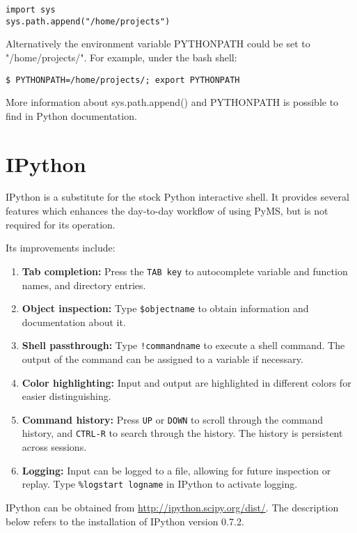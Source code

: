 \begin{verbatim}
import sys
sys.path.append("/home/projects")
\end{verbatim}

Alternatively the environment variable PYTHONPATH could be set
to "/home/projects/". For example, under the bash shell: 

\begin{verbatim}
$ PYTHONPATH=/home/projects/; export PYTHONPATH
\end{verbatim}

More information about sys.path.append() and PYTHONPATH is possible
to find in Python documentation.

\section{IPython}

IPython is a substitute for the stock Python interactive shell. It
provides several features which enhances the day-to-day workflow of
using PyMS, but is not required for its operation.

Its improvements include:
\begin{enumerate}
    \item {\bf Tab completion:} Press the {\tt TAB key} to autocomplete
          variable and function names, and directory entries.
    \item {\bf Object inspection:} Type {\tt \$objectname} to obtain
          information and documentation about it.
    \item {\bf Shell passthrough:} Type {\tt !commandname} to execute a
          shell command. The output of the command can be assigned to a
          variable if necessary.
    \item {\bf Color highlighting:} Input and output are highlighted in
          different colors for easier distinguishing.
    \item {\bf Command history:} Press {\tt UP} or {\tt DOWN} to scroll through the
          command history, and {\tt CTRL-R} to search through the history. The
          history is persistent across sessions.
    \item {\bf Logging:} Input can be logged to a file, allowing for
          future inspection or replay. Type {\tt \%logstart logname}
          in IPython to activate logging.
\end{enumerate}

IPython can be obtained from \url{http://ipython.scipy.org/dist/}. The
description below refers to the installation of IPython version 0.7.2.


